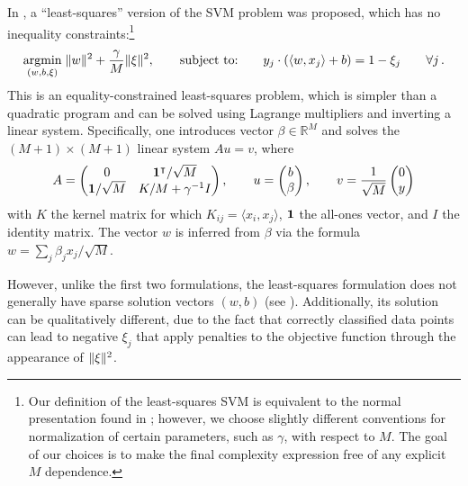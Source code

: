 \begin{refsection}
In \cite{suykens1999leastSquaresSVM}, a ``least-squares'' version of the SVM problem was proposed, which has no inequality constraints:\footnote{Our  definition of the least-squares SVM is equivalent to the normal presentation found in \cite{suykens1999leastSquaresSVM,rebentrost2014QSVM}; however, we choose slightly different conventions for normalization of certain parameters, such as $\gamma$, with respect to $M$. The goal of our choices is to make the final complexity expression free of any explicit $M$ dependence.}
\begin{equation}\label{eq:SVM_LS}
    \operatorname*{argmin}_{(w,b,\xi)} \; \lVert w\rVert^2 + \frac{\gamma}{M} \lVert\xi\rVert^2, \qquad 
    \text{subject to:} \qquad  y_j \cdot (\langle w,x_j \rangle + b) = 1-\xi_j \qquad \forall j\,.
\end{equation}
This is an equality-constrained least-squares problem, which is simpler than a quadratic program and can be solved using Lagrange multipliers and inverting a linear system. Specifically, one introduces vector $\beta \in \mathbb{R}^M$ and solves the $(M+1) \times (M+1)$ linear system $Au = v$, where
\begin{equation}
    A=\begin{pmatrix}
       0 & \mathbf{1}^\intercal/\sqrt{M}\\
       \mathbf{1}/\sqrt{M} & K/M + \gamma^{-1}I 
    \end{pmatrix}, \qquad 
    u = \begin{pmatrix}
        b \\
        \beta
    \end{pmatrix}, \qquad 
    v =\frac{1}{\sqrt{M}}\begin{pmatrix}
        0 \\
        y
    \end{pmatrix}
\end{equation}
with $K$ the kernel matrix for which $K_{ij} = \langle x_i, x_j \rangle$, $\mathbf{1}$ the all-ones vector, and $I$ the identity matrix. The vector $w$ is inferred from $\beta$ via the formula $w = \sum_j \beta_j x_j/\sqrt{M}$.

However, unlike the first two formulations, the least-squares formulation does not generally have sparse solution vectors $(w,b)$ (see \cite{suykens2002SVMsparse}). Additionally, its solution can be qualitatively different, due to the fact that correctly classified data points can lead to negative $\xi_j$ that apply penalties to the objective function through the appearance of $\lVert\xi\rVert^2$.  



\end{refsection}

